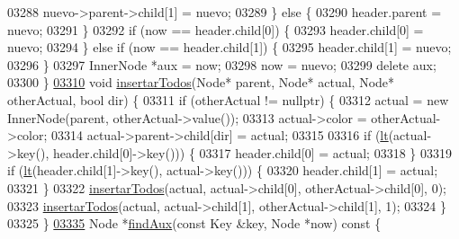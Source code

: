 \begin{DoxyCode}
03288                 nuevo->parent->child[1] = nuevo;
03289             \} \textcolor{keywordflow}{else} \{
03290                 header.parent = nuevo;
03291             \}
03292             \textcolor{keywordflow}{if} (now == header.child[0]) \{
03293                 header.child[0] = nuevo;
03294             \} \textcolor{keywordflow}{else} \textcolor{keywordflow}{if} (now == header.child[1]) \{
03295                 header.child[1] = nuevo;
03296             \}
03297             InnerNode *aux = now;
03298             now = nuevo;
03299             \textcolor{keyword}{delete} aux;
03300         \}
\hypertarget{map_8h_source.tex_l03310}{}\hyperlink{classaed2_1_1map_a9eaa25facfcd0b200b69f8cd684efc0a_a9eaa25facfcd0b200b69f8cd684efc0a}{03310}         \textcolor{keywordtype}{void} \hyperlink{classaed2_1_1map_a9eaa25facfcd0b200b69f8cd684efc0a_a9eaa25facfcd0b200b69f8cd684efc0a}{insertarTodos}(Node* parent, Node* actual, Node* otherActual, \textcolor{keywordtype}{bool} dir) \{
03311             \textcolor{keywordflow}{if} (otherActual != \textcolor{keyword}{nullptr}) \{
03312                 actual = \textcolor{keyword}{new} InnerNode(parent, otherActual->value());
03313                 actual->color = otherActual->color;
03314                 actual->parent->child[dir] = actual;
03315                 
03316                 \textcolor{keywordflow}{if} (\hyperlink{classaed2_1_1map_a0e5be36fae0693e4665bd2a615e7550a_a0e5be36fae0693e4665bd2a615e7550a}{lt}(actual->key(), header.child[0]->key())) \{
03317                     header.child[0] = actual;
03318                 \}
03319                 \textcolor{keywordflow}{if} (\hyperlink{classaed2_1_1map_a0e5be36fae0693e4665bd2a615e7550a_a0e5be36fae0693e4665bd2a615e7550a}{lt}(header.child[1]->key(), actual->key())) \{
03320                     header.child[1] = actual;
03321                 \}
03322                 \hyperlink{classaed2_1_1map_a9eaa25facfcd0b200b69f8cd684efc0a_a9eaa25facfcd0b200b69f8cd684efc0a}{insertarTodos}(actual, actual->child[0], otherActual->child[0], 0);
03323                 \hyperlink{classaed2_1_1map_a9eaa25facfcd0b200b69f8cd684efc0a_a9eaa25facfcd0b200b69f8cd684efc0a}{insertarTodos}(actual, actual->child[1], otherActual->child[1], 1);
03324             \}
03325         \}
\hypertarget{map_8h_source.tex_l03335}{}\hyperlink{classaed2_1_1map_aceb6b18a1a35f3c9bab1d1c378f3d14b_aceb6b18a1a35f3c9bab1d1c378f3d14b}{03335}         Node *\hyperlink{classaed2_1_1map_aceb6b18a1a35f3c9bab1d1c378f3d14b_aceb6b18a1a35f3c9bab1d1c378f3d14b}{findAux}(\textcolor{keyword}{const} Key &key, Node *now)\textcolor{keyword}{ const }\{

\end{DoxyCode}
